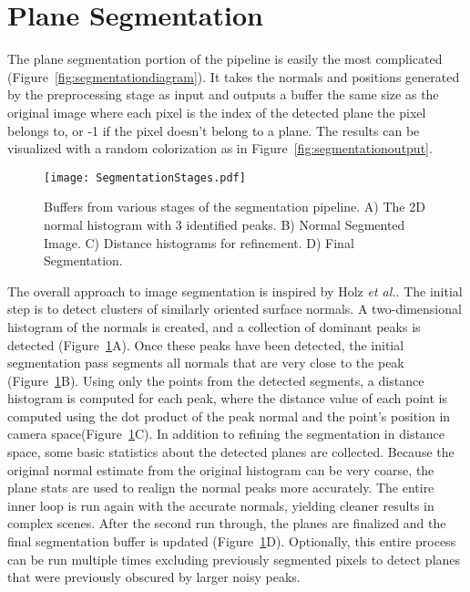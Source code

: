 \section{Plane Segmentation}
The plane segmentation portion of the pipeline is easily the most complicated (Figure~\ref{fig:segmentationdiagram}). It takes the normals and positions generated by the preprocessing stage as input and outputs a buffer the same size as the original image where each pixel is the index of the detected plane the pixel belongs to, or -1 if the pixel doesn't belong to a plane. The results can be visualized with a random colorization as in Figure~\ref{fig:segmentationoutput}.
\begin{figure}[ht]
    \centering
    \texttt{[image: SegmentationStages.pdf]}
    \caption{Buffers from various stages of the segmentation pipeline. A) The 2D normal histogram with 3 identified peaks. B) Normal Segmented Image. C) Distance histograms for refinement. D) Final Segmentation.}
    \label{fig:segmentationstages}
\end{figure}

The overall approach to image segmentation is inspired by Holz \textit{et al.}\cite{holz2012real}. The initial step is to detect clusters of similarly oriented surface normals. A two-dimensional histogram of the normals is created, and a collection of dominant peaks is detected (Figure~\ref{fig:segmentationstages}A). Once these peaks have been detected, the initial segmentation pass segments all normals that are very close to the peak (Figure~\ref{fig:segmentationstages}B). Using only the points from the detected segments, a distance histogram is computed for each peak, where the distance value of each point is computed using the dot product of the peak normal and the point's position in camera space(Figure~\ref{fig:segmentationstages}C). In addition to refining the segmentation in distance space, some basic statistics about the detected planes are collected. Because the original normal estimate from the original histogram can be very coarse, the plane stats are used to realign the normal peaks more accurately. The entire inner loop is run again with the accurate normals, yielding cleaner results in complex scenes. After the second run through, the planes are finalized and the final segmentation buffer is updated (Figure~\ref{fig:segmentationstages}D). Optionally, this entire process can be run multiple times excluding previously segmented pixels to detect planes that were previously obscured by larger noisy peaks.

